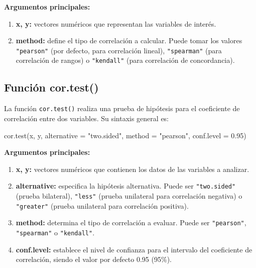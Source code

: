 \documentclass[
  spanish,
  letterpaper,
]{book}
\newenvironment{Shaded}{\begin{snugshade}}{\end{snugshade}}
\newcommand{\AttributeTok}[1]{\textcolor[rgb]{0.40,0.45,0.13}{#1}}
\newcommand{\FloatTok}[1]{\textcolor[rgb]{0.68,0.00,0.00}{#1}}
\newcommand{\FunctionTok}[1]{\textcolor[rgb]{0.28,0.35,0.67}{#1}}
\newcommand{\NormalTok}[1]{\textcolor[rgb]{0.00,0.23,0.31}{#1}}
\newcommand{\StringTok}[1]{\textcolor[rgb]{0.13,0.47,0.30}{#1}}
\begin{document}
\textbf{Argumentos principales:}

\begin{enumerate}
\def\labelenumi{\arabic{enumi}.}
\item
  \textbf{x, y:} vectores numéricos que representan las variables de
  interés.
\item
  \textbf{method:} define el tipo de correlación a calcular. Puede tomar
  los valores \texttt{"pearson"} (por defecto, para correlación lineal),
  \texttt{"spearman"} (para correlación de rangos) o \texttt{"kendall"}
  (para correlación de concordancia).
\end{enumerate}

\subsection{Función cor.test()}\label{funciuxf3n-cor.test}

La función \texttt{cor.test()} realiza una prueba de hipótesis para el
coeficiente de correlación entre dos variables. Su sintaxis general es:

\begin{Shaded}
\begin{Highlighting}[]
\FunctionTok{cor.test}\NormalTok{(x, y, }\AttributeTok{alternative =} \StringTok{"two.sided"}\NormalTok{, }\AttributeTok{method =} \StringTok{"pearson"}\NormalTok{, }\AttributeTok{conf.level =} \FloatTok{0.95}\NormalTok{)}
\end{Highlighting}
\end{Shaded}

\textbf{Argumentos principales:}

\begin{enumerate}
\def\labelenumi{\arabic{enumi}.}
\item
  \textbf{x, y:} vectores numéricos que contienen los datos de las
  variables a analizar.
\item
  \textbf{alternative:} especifica la hipótesis alternativa. Puede ser
  \texttt{"two.sided"} (prueba bilateral), \texttt{"less"} (prueba
  unilateral para correlación negativa) o \texttt{"greater"} (prueba
  unilateral para correlación positiva).
\item
  \textbf{method:} determina el tipo de correlación a evaluar. Puede ser
  \texttt{"pearson"}, \texttt{"spearman"} o \texttt{"kendall"}.
\item
  \textbf{conf.level:} establece el nivel de confianza para el intervalo
  del coeficiente de correlación, siendo el valor por defecto 0.95
  (95\%).
\end{enumerate}
\end{document}
